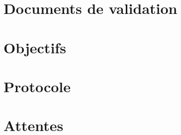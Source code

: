 \section{Documents de validation}
\lipsum[1]
    \section{Objectifs}
    \lipsum[1]
    \section{Protocole}
    \lipsum[1]
    \section{Attentes}
    \lipsum[1]